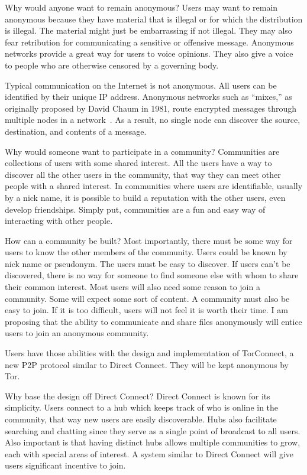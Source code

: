 \documentclass{article}
\begin{document}
Why would anyone want to remain anonymous?  Users may want to remain anonymous because they have material that is illegal or for which the distribution is illegal.  The material might just be embarrassing if not illegal.  They may also fear retribution for communicating a sensitive or offensive message.  Anonymous networks provide a great way for users to voice opinions.  They also give a voice to people who are otherwise censored by a governing body.

Typical communication on the Internet is not anonymous.  All users can be identified by their unique IP address.  Anonymous networks such as ``mixes,'' as originally proposed by David Chaum in 1981, route encrypted messages through multiple nodes in a network~\cite{chaum-mix}.  As a result, no single node can discover the source, destination, and contents of a message.

Why would someone want to participate in a community?  Communities are collections of users with some shared interest.  All the users have a way to discover all the other users in the community, that way they can meet other people with a shared interest.  In communities where users are identifiable, usually by a nick name, it is possible to build a reputation with the other users, even develop friendships.  Simply put, communities are a fun and easy way of interacting with other people.

How can a community be built?  Most importantly, there must be some way for users to know the other members of the community.  Users could be known by nick name or pseudonym.  The users must be easy to discover.  If users can't be discovered, there is no way for someone to find someone else with whom to share their common interest.  Most users will also need some reason to join a community.  Some will expect some sort of content.  A community must also be easy to join.  If it is too difficult, users will not feel it is worth their time.  I am proposing that the ability to communicate and share files anonymously will entice users to join an anonymous community.

Users have those abilities with the design and implementation of TorConnect, a new P2P protocol similar to Direct Connect.  They will be kept anonymous by Tor.

Why base the design off Direct Connect?  Direct Connect is known for its simplicity.  Users connect to a hub which keeps track of who is online in the community, that way new users are easily discoverable.  Hubs also facilitate searching and chatting since they serve as a single point of broadcast to all users.  Also important is that having distinct hubs allows multiple communities to grow, each with special areas of interest.  A system similar to Direct Connect will give users significant incentive to join.
\end{document}
